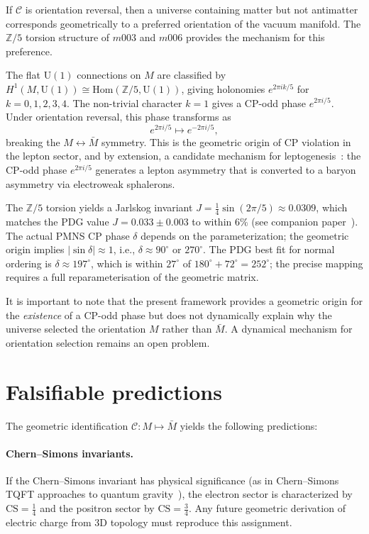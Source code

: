 \documentclass[12pt]{article}
\theoremstyle{definition}
\begin{document}
If $\mathcal{C}$ is orientation reversal, then a universe containing
matter but not antimatter corresponds geometrically to a preferred
orientation of the vacuum manifold. The $\mathbb{Z}/5$ torsion structure
of $m003$ and $m006$ provides the mechanism for this preference.

The flat $\mathrm{U}(1)$ connections on $M$ are classified by
$H^1(M, \mathrm{U}(1)) \cong \mathrm{Hom}(\mathbb{Z}/5, \mathrm{U}(1))$,
giving holonomies $e^{2\pi ik/5}$ for $k = 0, 1, 2, 3, 4$.
The non-trivial character $k=1$ gives a CP-odd phase $e^{2\pi i/5}$.
Under orientation reversal, this phase transforms as
\[
  e^{2\pi i/5} \longmapsto e^{-2\pi i/5},
\]
breaking the $M \leftrightarrow \bar{M}$ symmetry. This is the geometric
origin of CP violation in the lepton sector, and by extension, a
candidate mechanism for leptogenesis~\cite{Fukugita1986}: the CP-odd
phase $e^{2\pi i/5}$ generates a lepton asymmetry that is converted to
a baryon asymmetry via electroweak sphalerons.

The $\mathbb{Z}/5$ torsion yields a Jarlskog invariant
$J = \tfrac{1}{4}\sin(2\pi/5) \approx 0.0309$, which matches the PDG
value $J = 0.033 \pm 0.003$ to within $6\%$ (see companion
paper~\cite{Gentry:CP}). The actual PMNS CP phase $\delta$ depends on
the parameterization; the geometric origin implies $|\sin\delta| \approx
1$, i.e., $\delta \approx 90^\circ$ or $270^\circ$. The PDG best fit
for normal ordering is $\delta \approx 197^\circ$, which is within
$27^\circ$ of $180^\circ+72^\circ=252^\circ$; the precise mapping
requires a full reparameterisation of the geometric matrix.

It is important to note that the present framework provides a geometric
origin for the \emph{existence} of a CP-odd phase but does not
dynamically explain why the universe selected the orientation $M$ rather
than $\bar{M}$. A dynamical mechanism for orientation selection remains
an open problem.

\section{Falsifiable predictions}
\label{sec:predictions}

The geometric identification $\mathcal{C}: M \mapsto \bar{M}$ yields
the following predictions:

\paragraph{Chern--Simons invariants.}
If the Chern--Simons invariant has physical significance (as in
Chern--Simons TQFT approaches to quantum gravity~\cite{Witten1989}),
the electron sector is characterized by $\mathrm{CS} = \tfrac{1}{4}$
and the positron sector by $\mathrm{CS} = \tfrac{3}{4}$. Any future
geometric derivation of electric charge from 3D topology must reproduce
this assignment.
\end{document}
